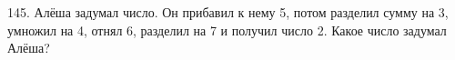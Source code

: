 145. Алёша задумал число. Он прибавил к нему 5, потом разделил сумму на 3, умножил на 4, отнял 6, разделил на 7 и получил число 2. Какое число задумал Алёша?\\

